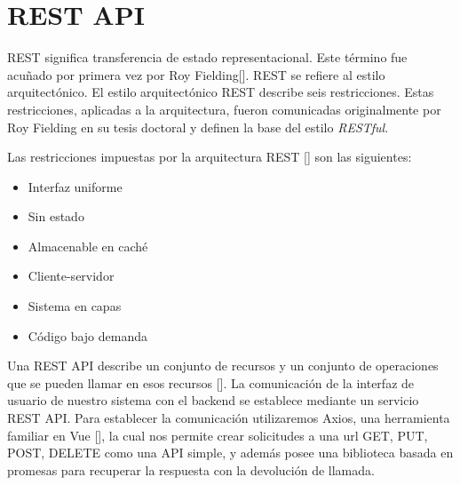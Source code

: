 \section{REST API}


REST significa transferencia de estado representacional. Este término fue acuñado por primera vez por Roy Fielding[\cite{62}]. REST se refiere al estilo arquitectónico. El estilo arquitectónico REST describe seis restricciones. Estas restricciones, aplicadas a la arquitectura, fueron comunicadas originalmente por Roy Fielding en su tesis doctoral y definen la base del estilo \textit{RESTful}. 

Las restricciones impuestas por la arquitectura REST [\cite{56,62}] son las siguientes:
\begin{itemize}
\item Interfaz uniforme
\item Sin estado
\item Almacenable en caché
\item Cliente-servidor
\item Sistema en capas
\item Código bajo demanda
\end{itemize}

Una REST API describe un conjunto de recursos y un conjunto de operaciones que se pueden llamar en esos recursos [\cite{56}]. La comunicación de la interfaz de usuario de nuestro sistema con el backend se establece mediante un servicio REST API. Para establecer la comunicación utilizaremos Axios, una herramienta familiar en Vue [\cite{46}], la cual nos permite crear solicitudes a una url GET, PUT, POST, DELETE como una API  simple, y además posee una biblioteca basada en promesas para recuperar la respuesta con la devolución de llamada.

